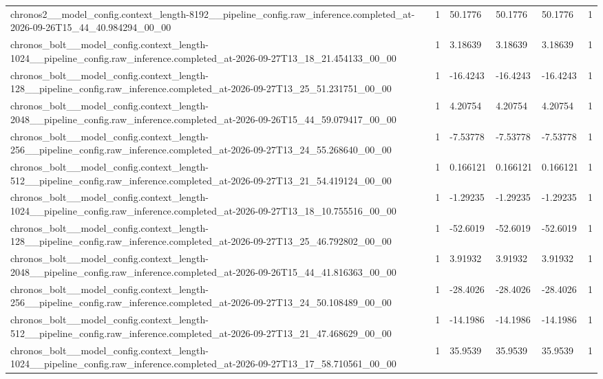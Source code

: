 \begin{tabular}{llllll}
chronos2\_\_model\_config.context\_length-8192\_\_pipeline\_config.raw\_inference.completed\_at-2026-09-26T15\_44\_40.984294\_00\_00 & 1 & 50.1776 & 50.1776 & 50.1776 & 1 \\
chronos\_bolt\_\_model\_config.context\_length-1024\_\_pipeline\_config.raw\_inference.completed\_at-2026-09-27T13\_18\_21.454133\_00\_00 & 1 & 3.18639 & 3.18639 & 3.18639 & 1 \\
chronos\_bolt\_\_model\_config.context\_length-128\_\_pipeline\_config.raw\_inference.completed\_at-2026-09-27T13\_25\_51.231751\_00\_00 & 1 & -16.4243 & -16.4243 & -16.4243 & 1 \\
chronos\_bolt\_\_model\_config.context\_length-2048\_\_pipeline\_config.raw\_inference.completed\_at-2026-09-26T15\_44\_59.079417\_00\_00 & 1 & 4.20754 & 4.20754 & 4.20754 & 1 \\
chronos\_bolt\_\_model\_config.context\_length-256\_\_pipeline\_config.raw\_inference.completed\_at-2026-09-27T13\_24\_55.268640\_00\_00 & 1 & -7.53778 & -7.53778 & -7.53778 & 1 \\
chronos\_bolt\_\_model\_config.context\_length-512\_\_pipeline\_config.raw\_inference.completed\_at-2026-09-27T13\_21\_54.419124\_00\_00 & 1 & 0.166121 & 0.166121 & 0.166121 & 1 \\
chronos\_bolt\_\_model\_config.context\_length-1024\_\_pipeline\_config.raw\_inference.completed\_at-2026-09-27T13\_18\_10.755516\_00\_00 & 1 & -1.29235 & -1.29235 & -1.29235 & 1 \\
chronos\_bolt\_\_model\_config.context\_length-128\_\_pipeline\_config.raw\_inference.completed\_at-2026-09-27T13\_25\_46.792802\_00\_00 & 1 & -52.6019 & -52.6019 & -52.6019 & 1 \\
chronos\_bolt\_\_model\_config.context\_length-2048\_\_pipeline\_config.raw\_inference.completed\_at-2026-09-26T15\_44\_41.816363\_00\_00 & 1 & 3.91932 & 3.91932 & 3.91932 & 1 \\
chronos\_bolt\_\_model\_config.context\_length-256\_\_pipeline\_config.raw\_inference.completed\_at-2026-09-27T13\_24\_50.108489\_00\_00 & 1 & -28.4026 & -28.4026 & -28.4026 & 1 \\
chronos\_bolt\_\_model\_config.context\_length-512\_\_pipeline\_config.raw\_inference.completed\_at-2026-09-27T13\_21\_47.468629\_00\_00 & 1 & -14.1986 & -14.1986 & -14.1986 & 1 \\
chronos\_bolt\_\_model\_config.context\_length-1024\_\_pipeline\_config.raw\_inference.completed\_at-2026-09-27T13\_17\_58.710561\_00\_00 & 1 & 35.9539 & 35.9539 & 35.9539 & 1 \\

\end{tabular}
